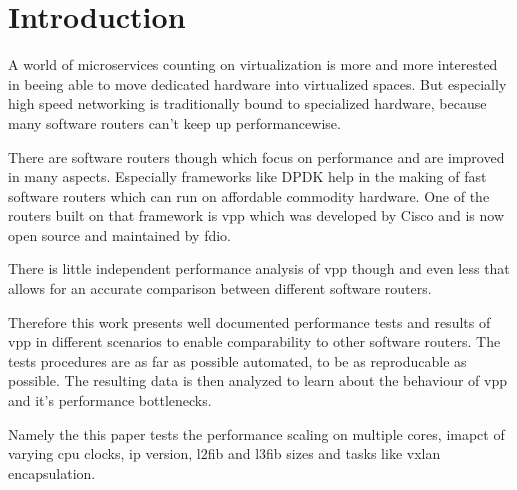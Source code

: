 
\chapter{Introduction}


A world of microservices counting on virtualization is more and
more interested in beeing able to move dedicated hardware into
virtualized spaces. But especially high speed networking is
traditionally bound to specialized hardware, because many software
routers can't keep up performancewise.


There are software routers though which focus on performance and are
improved in many aspects. Especially frameworks like DPDK help in the
making of fast software routers which can run on affordable commodity
hardware. One of the routers built on that framework is \Ac{vpp} which
was developed by Cisco and is now open source and maintained by
\Ac{fdio}.


There is little independent performance analysis of \Ac{vpp} though and even less that allows for an accurate comparison between different software routers. 



Therefore this work presents well documented performance tests and
results of \Ac{vpp} in different scenarios to enable comparability to
other software routers. The tests procedures are as far as possible
automated, to be as reproducable as possible. The resulting data is
then analyzed to learn about the behaviour of \Ac{vpp} and it's
performance bottlenecks. 


Namely the this paper tests the performance scaling on multiple cores, imapct of varying cpu clocks, ip version, l2fib and l3fib sizes and tasks like vxlan encapsulation. 


